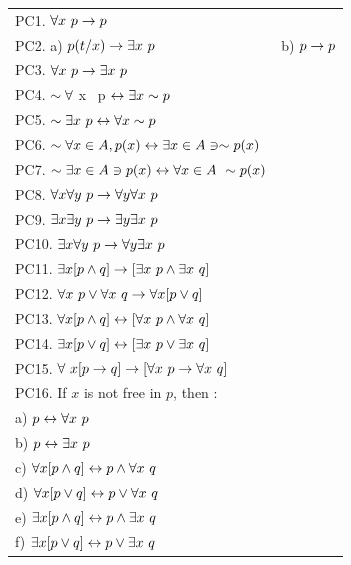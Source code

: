 \begin{large}
\newpage
\begin{tabular}{ l l}
PC1. $\forall x~ p \to p$ &\\
PC2. a) $p(t/x) \to \exists x~ p$   &b) $p \to p$ \\
PC3. $\forall x~ p \to \exists x~ p$ &\\
PC4. $\sim \forall $ x~ p $\leftrightarrow \exists x \sim p$ &\\
PC5. $\sim \exists x~ p \leftrightarrow \forall x \sim p$ &\\
PC6. $\sim \forall x \in A, p(x) \leftrightarrow  \exists x \in A \ni \sim p(x)$&\\
PC7. $\sim \exists x \in A \ni p(x) \leftrightarrow \forall x \in A ~ \sim p(x)$ &\\
PC8. $\forall x \forall y ~p \to \forall y \forall x~ p$&\\
PC9.  $\exists x \exists y ~p \to \exists y \exists x ~p$&\\
PC10. $\exists x \forall y~p \to \forall y \exists x~ p$&\\
PC11.  $\exists x [p \wedge q] \to [ \exists x ~p \wedge \exists x~ q]$&\\
PC12.  $\forall x ~p \lor \forall x ~q \to \forall x [p \lor q]$&\\
PC13.  $\forall x [p \wedge q] \leftrightarrow [\forall x ~ p \wedge \forall x~ q]$ &\\
PC14. $\exists x [p \lor q] \leftrightarrow [\exists x ~ p \lor \exists x ~q]$& \\
PC15. $\forall ~x[p \to q] \to [\forall x~p \to \forall x ~q]$&\\
PC16.  If $x$ is not free in $p$, then :&\\
a) $p \leftrightarrow \forall x~p$&\\
b) $p \leftrightarrow \exists x~p$&\\
c) $\forall x[p \wedge q] \leftrightarrow p \wedge \forall x~q$&\\
d) $\forall x [p \lor q] \leftrightarrow p \lor \forall x~q$&\\
e) $\exists x [ p \wedge q] \leftrightarrow p \wedge \exists x~q$&\\
f) $\exists x[p\lor q] \leftrightarrow p \lor \exists x~q$&\\
\end{tabular}\nl



\end{large}
